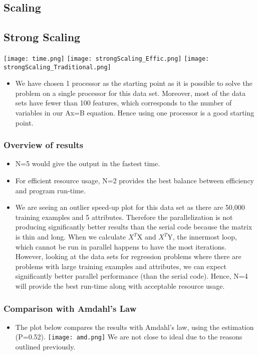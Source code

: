 \documentclass{article}
\begin{document}
\begin{spacing}{1.1}
\section{Scaling}

\subsection{Strong Scaling}
    \begin{itemize}
    \texttt{[image: time.png]}
    \texttt{[image: strongScaling\_Effic.png]}
    \texttt{[image: strongScaling\_Traditional.png]}
    \newline
    \begin{itemize}
    \item We have chosen 1 processor as the starting point as it is possible to solve the problem on a single processor for this data set. Moreover, most of the data sets have fewer than 100 features, which corresponds to the number of variables in our Ax=B equation. Hence using one processor is a good starting point. 
    \end{itemize}
    \end{itemize}
\subsubsection{Overview of results}
    \begin{itemize}
        \item N=5 would give the output in the fastest time.
        \item For efficient resource usage, N=2 provides the best balance between efficiency and program run-time.
        \item We are seeing an outlier speed-up plot for this data set as there are 50,000 training examples and 5 attributes. Therefore the parallelization is not producing significantly better results than the serial code because the matrix is thin and long. When we calculate $X^T$X and $X^T$Y, the innermost loop, which cannot be run in parallel happens to have the most iterations. However, looking at the data sets for regression problems where there are problems with large training examples and attributes, we can expect significantly better parallel performance (than the serial code). Hence, N=4 will provide the best run-time along with acceptable resource usage.
    \end{itemize}
    \subsubsection{Comparison with Amdahl's Law}
    \begin{itemize}
        \item The plot below compares the results with Amdahl's law, using the estimation (P=0.52). \newline
        \texttt{[image: amd.png]}
        \newline
        We are not close to ideal due to the reasons outlined previously.
    \end{itemize}


\end{spacing}
\end{document}
